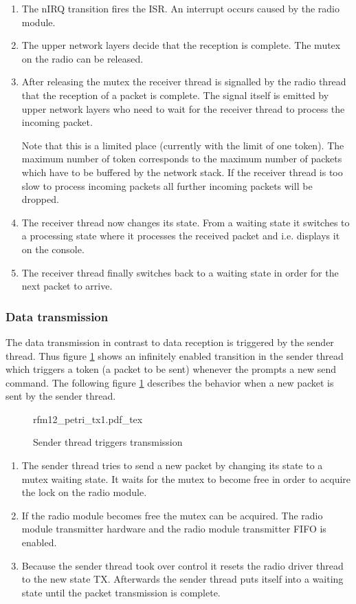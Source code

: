 \begin{enumerate}
    \item The nIRQ transition fires the ISR. An interrupt occurs caused by the radio module.
    \item The upper network layers decide that the reception is complete. The mutex on the radio can be released.
    \item After releasing the mutex the receiver thread is signalled by the radio thread that the reception of a packet is complete. The signal itself is emitted by upper network layers who need to wait for the receiver thread to process the incoming packet.

    Note that this is a limited place (currently with the limit of one token). The maximum number of token corresponds to the maximum number of packets which have to be buffered by the network stack. If the receiver thread is too slow to process incoming packets all further incoming packets will be dropped.

    \item The receiver thread now changes its state. From a waiting state it switches to a processing state where it processes the received packet and i.e. displays it on the console.
    \item The receiver thread finally switches back to a waiting state in order for the next packet to arrive.
\end{enumerate}

\subsubsection{Data transmission} %
\label{sub:data_transmission}

The data transmission in contrast to data reception is triggered by the sender thread. Thus figure \ref{fig:petri-tx1} shows an infinitely enabled transition in the sender thread which triggers a token (a packet to be sent) whenever the prompts a new send command. The following figure \ref{fig:petri-tx1} describes the behavior when a new packet is sent by the sender thread.

\begin{figure}[H]
\centering
{rfm12_petri_tx1.pdf_tex}
\caption{Sender thread triggers transmission}
\label{fig:petri-tx1}
\end{figure}

\begin{enumerate}
    \item The sender thread tries to send a new packet by changing its state to a mutex waiting state. It waits for the mutex to become free in order to acquire the lock on the radio module.
    \item If the radio module becomes free the mutex can be acquired. The radio module transmitter hardware and the radio module transmitter FIFO is enabled.
    \item Because the sender thread took over control it resets the radio driver thread to the new state TX. Afterwards the sender thread puts itself into a waiting state until the packet transmission is complete.
\end{enumerate}

